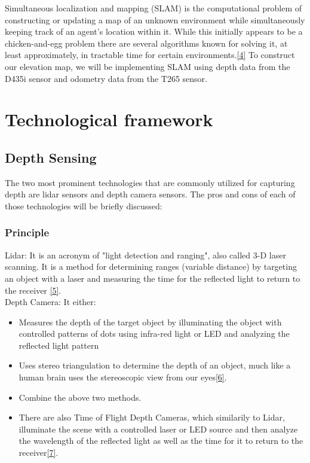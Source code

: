 \documentclass{article}
\begin{document}
Simultaneous localization and mapping (SLAM) is the computational problem of constructing or updating a map of an unknown environment while simultaneously keeping track of an agent's location within it. While this initially appears to be a chicken-and-egg problem there are several algorithms known for solving it, at least approximately, in tractable time for certain environments.\href{https://en.wikipedia.org/wiki/Simultaneous_localization_and_mapping}{[4]}
To construct our elevation map, we will be implementing SLAM using depth data from the D435i sensor and odometry data from the T265 sensor.

\section{Technological framework}

\subsection{Depth Sensing}

The two most prominent technologies that are commonly utilized for capturing depth are lidar sensors and depth camera sensors. The pros and cons of each of those technologies will be briefly discussed:

\subsubsection{Principle}

Lidar: It is an acronym of "light detection and ranging", also called 3-D laser scanning. It is a method for determining ranges (variable distance) by targeting an object with a laser and measuring the time for the reflected light to return to the receiver \href{https://en.wikipedia.org/wiki/Lidar}{[5]}. \\
Depth Camera: It either:

\begin{itemize}

\item Measures the depth of the target object by illuminating the object with controlled patterns of dots using infra-red light or LED and analyzing the reflected light pattern
\item Uses stereo triangulation to determine the depth of an object, much like a human brain uses the stereoscopic view from our eyes\href{https://lidarradar.com/info/differences-between-the-lidar-systems-and-depth-camera}{[6]}.
\item Combine the above two methods.
\item There are also Time of Flight Depth Cameras, which similarily to Lidar, illuminate the scene with a controlled laser or LED source and then analyze the wavelength of the reflected light as well as the time for it to return to the receiver\href{https://www.researchgate.net/publication/347124772_An_Overview_of_Depth_Cameras_and_Range_Scanners_Based_on_Time-of-Flight_Technologies}{[7]}.

\end{itemize}
\end{document}
